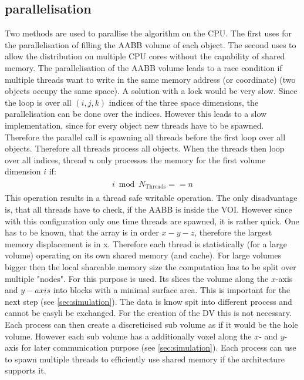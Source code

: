 \subsection{parallelisation}
% 
Two methods are used to parallise the algorithm on the \ac{CPU}.
The first uses \openmp for the parallelisation of filling the \ac{AABB} volume of each object.
The second uses \mpi to allow the distribution on multiple \ac{CPU} cores without the capability of shared memory. 
% 
The parallelisation of the \ac{AABB} volume leads to a race condition if multiple threads want to write in the same memory address (or coordinate) (\eg two objects occupy the same space).
A solution with a lock would be very slow.
Since the loop is over all $(i,j,k)$ indices of the three space dimensions, the parallelisation can be done over the indices.
However this leads to a slow implementation, since for every object new threads have to be spawned.
Therefore the parallel call is spawning all threads before the first loop over all objects.
Therefore all threads process all objects.
When the threads then loop over all indices, thread $n$ only processes the memory for the first volume dimension $i$ if:
% 
\begin{align}
\begin{split}
    i \bmod N_{\text{Threads}} == n
\end{split}
\end{align}
% 
This operation results in a thread safe writable operation.
The only disadvantage is, that all threads have to check, if the \ac{AABB} is inside the \ac{VOI}.
However since with this configuration only one time threads are spawned, it is rather quick.
One has to be known, that the array is in order $x-y-z$, therefore the largest memory displacement is in x.
Therefore each thread is statistically (for a large volume) operating on its own shared memory (and cache).
% 
For large volumes bigger then the local shareable memory size the computation has to be split over multiple "nodes".
For this purpose \mpi is used.
Its slices the volume along the $x$-axis and $y-axis$ into blocks with a minimal surface area.
This is important for the next step (see \cref{sec:simulation}).
The data is know spit into different process and cannot be easyli be exchanged.
For the creation of the DV this is not necessary.
Each \mpi process can then create a discreticised sub volume as if it would be the hole volume.
However each sub volume has a additionally voxel along the $x$- and $y$-axis for later communication purpose (see \cref{sec:simulation}).
Each \mpi process can use \openmp to spawn multiple threads to efficiently use shared memory if the architecture supports it.
% 
% 
% 

